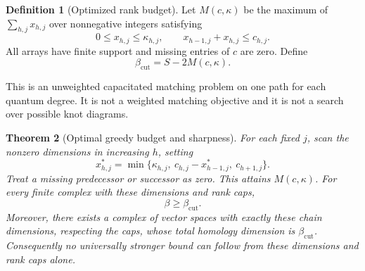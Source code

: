 \documentclass[11pt,letterpaper]{article}
\newtheorem{theorem}{Theorem}[section]
\theoremstyle{definition}\newtheorem{definition}[theorem]{Definition}
\theoremstyle{remark}\newtheorem{remark}[theorem]{Remark}
\newcommand{\cutlb}{\beta_{\mathrm{cut}}}
\begin{document}
\begin{definition}[Optimized rank budget]
Let $M(c,\kappa)$ be the maximum of $\sum_{h,j}x_{h,j}$ over nonnegative
integers satisfying
\begin{equation}
0\leq x_{h,j}\leq\kappa_{h,j},\qquad
x_{h-1,j}+x_{h,j}\leq c_{h,j}.
\label{eq:budgetlp}
\end{equation}
All arrays have finite support and missing entries of $c$ are zero. Define
\[
\cutlb=S-2M(c,\kappa).
\]
\end{definition}
This is an unweighted capacitated matching problem on one path for each
quantum degree. It is not a weighted matching objective and it is not a
search over possible knot diagrams.

\begin{theorem}[Optimal greedy budget and sharpness]\label{thm:budget}
For each fixed $j$, scan the nonzero dimensions in increasing $h$, setting
\begin{equation}
x^*_{h,j}=\min\{\kappa_{h,j},\ c_{h,j}-x^*_{h-1,j},\ c_{h+1,j}\}.
\label{eq:greedy}
\end{equation}
Treat a missing predecessor or successor as zero. This attains
$M(c,\kappa)$. For every finite complex with these dimensions and rank caps,
\begin{equation}
\beta\geq\cutlb.
\label{eq:sharpbound}
\end{equation}
Moreover, there exists a complex of vector spaces with exactly these
chain dimensions, respecting the caps, whose total homology dimension is
$\cutlb$. Consequently no universally stronger bound can follow from these
dimensions and rank caps alone.
\end{theorem}
\end{document}
